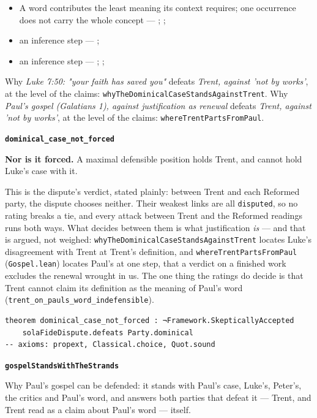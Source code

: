 \documentclass[11pt]{article}
\begin{document}
\begin{itemize}
\begin{itemize}
\item A word contributes the least meaning its context requires; one occurrence does not carry the whole concept --- \cite{silva-biblical-words-1994}; \cite{joos-semantic-axiom-1972}; \cite{barr-semantics-2004}
\item an inference step --- \cite[ad loc. Rom 4:6]{moo-romans-1996}; \cite[s.v. λογίζομαι]{bauer-danker-lexicon-2000}
\item an inference step --- \cite{silva-biblical-words-1994}; \cite[p. 80]{moo-romans-1996}; \cite{barr-semantics-2004}
\end{itemize}
\end{itemize}
\noindent Why \emph{Luke 7:50: "your faith has saved you"} defeats \emph{Trent, against 'not by works'}, at the level of the claims: \texttt{why\allowbreak{}The\allowbreak{}Dominical\allowbreak{}Case\allowbreak{}Stands\allowbreak{}Against\allowbreak{}Trent}.
\noindent Why \emph{Paul's gospel (Galatians 1), against justification as renewal} defeats \emph{Trent, against 'not by works'}, at the level of the claims: \texttt{where\allowbreak{}Trent\allowbreak{}Parts\allowbreak{}From\allowbreak{}Paul}.
\par\medskip\noindent\textbf{\texttt{dominical\_\allowbreak{}case\_\allowbreak{}not\_\allowbreak{}forced}}\par\nobreak\noindent
\textbf{Nor is it forced.} A maximal defensible position holds Trent, and cannot hold Luke's case with it.

This is the dispute's verdict, stated plainly: between Trent and each Reformed party, the dispute chooses neither. Their weakest links are all \texttt{disputed}, so no rating breaks a tie, and every attack between Trent and the Reformed readings runs both ways. What decides between them is what justification \emph{is} — and that is argued, not weighed: \texttt{why\allowbreak{}The\allowbreak{}Dominical\allowbreak{}Case\allowbreak{}Stands\allowbreak{}Against\allowbreak{}Trent} locates Luke's disagreement with Trent at Trent's definition, and \texttt{where\allowbreak{}Trent\allowbreak{}Parts\allowbreak{}From\allowbreak{}Paul} (\texttt{Gospel.lean}) locates Paul's at one step, that a verdict on a finished work excludes the renewal wrought in us. The one thing the ratings do decide is that Trent cannot claim its definition as the meaning of Paul's word (\texttt{trent\_\allowbreak{}on\_\allowbreak{}pauls\_\allowbreak{}word\_\allowbreak{}indefensible}).

{\small\begin{verbatim}
theorem dominical_case_not_forced : ¬Framework.SkepticallyAccepted
    solaFideDispute.defeats Party.dominical
-- axioms: propext, Classical.choice, Quot.sound
\end{verbatim}}
\par\medskip\noindent\textbf{\texttt{gospel\allowbreak{}Stands\allowbreak{}With\allowbreak{}The\allowbreak{}Strands}}\par\nobreak\noindent
Why Paul's gospel can be defended: it stands with Paul's case, Luke's, Peter's, the critics and Paul's word, and answers both parties that defeat it — Trent, and Trent read as a claim about Paul's word — itself.
\end{document}
